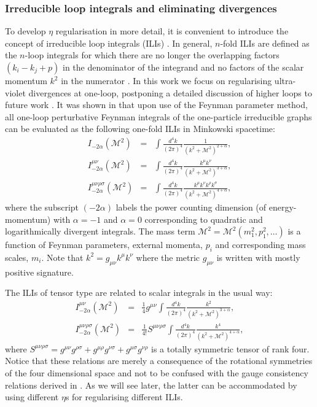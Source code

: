 \documentclass[12pt, letter]{article}
\newcommand{\M}{\mathcal{M}}
\begin{document}
\subsubsection{Irreducible loop integrals and eliminating divergences} \label{sec:ilis}
To develop $\eta$ regularisation in more detail, it is convenient to introduce the concept of irreducible loop integrals (ILIs) \citep{Wu03,Wu04,Wu14}. In general, $n$-fold ILIs are defined as the $n$-loop integrals for which there are no longer the overlapping factors $(k_i - k_j + p)$ in the denominator of the integrand and no factors of the scalar momentum  $k^2$ in the numerator \cite{Wu14}.  In this work we  focus on regularising ultra-violet divergences at one-loop, postponing a detailed discussion of higher loops to future work \citep{PadillaSmith23}.  It was shown in \cite{Wu03} that upon use of the Feynman parameter method, all one-loop perturbative Feynman integrals of the one-particle irreducible graphs can be evaluated as the following one-fold ILIs in Minkowski spacetime:
\begin{eqnarray}
I_{-2\alpha} (\M^2)&=& \int \frac{d^4 k}{(2 \pi)^4} \frac{1}{(k^2 +\M^2)^{2 + \alpha}}, \label{ILIs1} \\ 
I_{-2 \alpha}^{ \mu \nu} (\M^2) &=& \int \frac{d^4 k}{(2 \pi)^4}  \frac{k^{\mu}k^{\nu}}{(k^2 +\M^2)^{3+\alpha}}, \label{ILIs2} \\ 
I_{-2 \alpha}^{\mu \nu \rho \sigma} (\M^2) &=& \int \frac{d^4 k}{(2 \pi)^4}  \frac{k^{\mu}k^{\nu}k^{\rho}k^{\sigma}}{(k^2 +\M^2)^{4+\alpha}}, \label{ILIs3}
\end{eqnarray}
where the subscript $(-2\alpha)$ labels the power counting dimension (of energy-momentum) with  $\alpha = -1$ and $\alpha = 0$ corresponding  to quadratic and logarithmically divergent integrals.  The mass term  $\M^2 =\M^2(m^2_1, p_1^2, \dots) $ is a function of Feynman parameters, external momenta, $p_i$ and corresponding mass scales, $m_i$.  Note that $k^2=g_{\mu\nu} k^\mu k^\nu$ where the metric $g_{\mu\nu}$ is written with mostly positive signature. 

The ILIs of tensor type are related to scalar integrals in the usual way:
\begin{eqnarray}
I_{-2 \alpha}^{ \mu \nu} (\M^2) &=&\frac14 g^{\mu\nu} \int \frac{d^4 k}{(2 \pi)^4}  \frac{k^2}{(k^2 +\M^2)^{3+\alpha}}, \label{ILIs2scal} \\ 
I_{-2 \alpha}^{\mu \nu \rho \sigma} (\M^2) &=& \frac{1}{4!} S^{\mu\nu \rho\sigma}  \int \frac{d^4 k}{(2 \pi)^4}  \frac{k^4}{(k^2 +\M^2)^{4+\alpha}}, \label{ILIs3scal}
\end{eqnarray}
where $S^{\mu\nu\rho\sigma}=g^{\mu\nu}g^{\rho\sigma}+g^{\mu\rho}g^{\nu\sigma}+g^{\mu\sigma}g^{\nu\rho}$ is a totally symmetric tensor of rank four. 
Notice that these relations are merely  a consequence of  the rotational  symmetries of the  four dimensional space and not to be confused with the gauge consistency relations derived in \citep{Wu03,Wu04,Wu14}. As we will see later,  the latter can be accommodated by using different $\eta$s for regularising different ILIs. 
\end{document}
